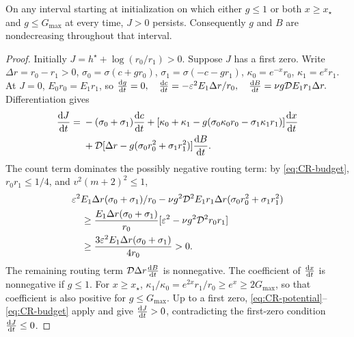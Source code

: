 \begin{lemma}
\label{lem:CR-monotone}
On any interval starting at initialization on which either $g\le1$ or both $x\ge x_\star$ and $g\le G_{\max}$ at every time,
$J>0$ persists. Consequently $g$ and $B$ are nondecreasing throughout that interval.
\end{lemma}
\begin{proof}
Initially $J=h^\star+\log(r_0/r_1)>0$. Suppose $J$ has a first zero.
Write $\Delta r=r_0-r_1>0$, $\sigma_0=\sigma(c+gr_0)$, $\sigma_1=\sigma(-c-gr_1)$,
$\kappa_0=e^{-x}r_0$, $\kappa_1=e^xr_1$.
At $J=0$, $E_0r_0=E_1r_1$, so
 $\ddt{g}=0,\quad \ddt{c}=-\initscale^2 E_1\Delta r/r_0,\quad \ddt{B}=\nu g\mathcal DE_1r_1\Delta r.$ 
Differentiation gives
\begin{align*}
 \ddt{J}={}&-(\sigma_0+\sigma_1)\ddt{c}
 +[\kappa_0+\kappa_1-g(\sigma_0\kappa_0r_0-\sigma_1\kappa_1r_1)]\ddt{x}\\
 &+\mathcal D[\Delta r-g(\sigma_0r_0^2+\sigma_1r_1^2)]\ddt{B}.
\end{align*}
The count term dominates the possibly negative routing term: by \eqref{eq:CR-budget}, $r_0r_1\le1/4$, and $v^2(m+2)^2\le1$,
\begin{align*}
 &\varepsilon^2 E_1\Delta r(\sigma_0+\sigma_1)/r_0
 -\nu g^2\mathcal D^2E_1r_1\Delta r(\sigma_0r_0^2+\sigma_1r_1^2)\\
 &\hspace{1em}\ge\frac{E_1\Delta r(\sigma_0+\sigma_1)}{r_0}
       [\varepsilon^2-\nu g^2\mathcal D^2r_0r_1]\\
 &\hspace{1em}\ge\frac{3\varepsilon^2 E_1\Delta r(\sigma_0+\sigma_1)}{4r_0}>0.
\end{align*}
The remaining routing term $\mathcal D\Delta r\ddt{B}$ is nonnegative.
The coefficient of $\ddt{x}$ is nonnegative if $g\le1$.
For $x\ge x_\star$, $\kappa_1/\kappa_0=e^{2x}r_1/r_0\ge e^x\ge2G_{\max}$, so that coefficient is also positive for $g\le G_{\max}$.
Up to a first zero, \eqref{eq:CR-potential}--\eqref{eq:CR-budget} apply and give $\ddt{J}>0$, contradicting the first-zero condition $\ddt{J}\le0$.
\end{proof}

